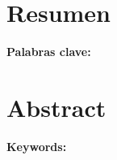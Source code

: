 
\newpage

\chapter*{Resumen}


\vspace{0.5cm}
\noindent\textbf{Palabras clave:}
\thispagestyle{empty}


\chapter*{Abstract}


\vspace{0.5cm}
\noindent\textbf{Keywords:}
\thispagestyle{empty}

\newpage
\setcounter{page}{1}
\pagestyle{empty}
\mbox{}
\newpage
